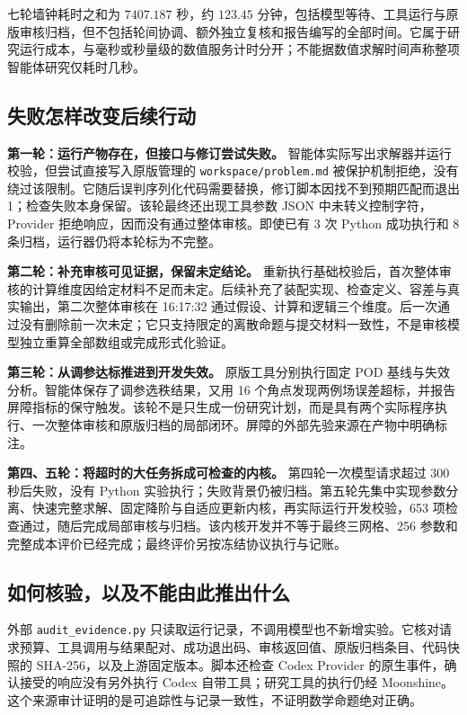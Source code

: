 七轮墙钟耗时之和为 $7407.187$ 秒，约 $123.45$ 分钟，包括模型等待、工具运行与原版审核归档，但不包括轮间协调、额外独立复核和报告编写的全部时间。它属于研究运行成本，与毫秒或秒量级的数值服务计时分开；不能据数值求解时间声称整项智能体研究仅耗时几秒。

\subsection{失败怎样改变后续行动}
\textbf{第一轮：运行产物存在，但接口与修订尝试失败。}
智能体实际写出求解器并运行校验，但尝试直接写入原版管理的 \texttt{workspace/problem.md} 被保护机制拒绝，没有绕过该限制。它随后误判序列化代码需要替换，修订脚本因找不到预期匹配而退出 1；检查失败本身保留。该轮最终还出现工具参数 JSON 中未转义控制字符，Provider 拒绝响应，因而没有通过整体审核。即使已有 3 次 Python 成功执行和 8 条归档，运行器仍将本轮标为不完整。

\textbf{第二轮：补充审核可见证据，保留未定结论。}
重新执行基础校验后，首次整体审核的计算维度因给定材料不足而未定。后续补充了装配实现、检查定义、容差与真实输出，第二次整体审核在 16:17:32 通过假设、计算和逻辑三个维度。后一次通过没有删除前一次未定；它只支持限定的离散命题与提交材料一致性，不是审核模型独立重算全部数组或完成形式化验证。

\textbf{第三轮：从调参达标推进到开发失效。}
原版工具分别执行固定 POD 基线与失效分析。智能体保存了调参选秩结果，又用 16 个角点发现两例场误差超标，并报告屏障指标的保守触发。该轮不是只生成一份研究计划，而是具有两个实际程序执行、一次整体审核和原版归档的局部闭环。屏障的外部先验来源在产物中明确标注。

\textbf{第四、五轮：将超时的大任务拆成可检查的内核。}
第四轮一次模型请求超过 300 秒后失败，没有 Python 实验执行；失败背景仍被归档。第五轮先集中实现参数分离、快速完整求解、固定降阶与自适应更新内核，再实际运行开发校验，653 项检查通过，随后完成局部审核与归档。该内核开发并不等于最终三网格、256 参数和完整成本评价已经完成；最终评价另按冻结协议执行与记账。

\subsection{如何核验，以及不能由此推出什么}
外部 \texttt{audit\_evidence.py} 只读取运行记录，不调用模型也不新增实验。它核对请求预算、工具调用与结果配对、成功退出码、审核返回值、原版归档条目、代码快照的 SHA-256，以及上游固定版本。脚本还检查 Codex Provider 的原生事件，确认接受的响应没有另外执行 Codex 自带工具；研究工具的执行仍经 Moonshine。这个来源审计证明的是可追踪性与记录一致性，不证明数学命题绝对正确。

